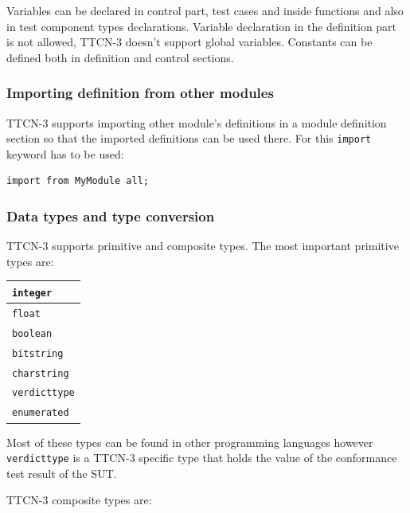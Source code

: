 \documentclass[a4paper]{article}
\begin{document}
Variables can be declared in control part, test cases and inside functions and also in test component types
declarations. Variable declaration in the definition part is not allowed, TTCN-3 doesn't support global variables.
Constants can be defined both in definition and control sections.

\subsubsection{Importing definition from other modules}
TTCN-3 supports importing other module's definitions in a module definition section so that the imported definitions
can be used there. For this \verb.import. keyword has to be used:
{\footnotesize
\begin{lstlisting}
import from MyModule all;
\end{lstlisting}
}

\subsubsection{Data types and type conversion}
TTCN-3 supports primitive and composite types.
The most important primitive types are:
{\footnotesize
\begin{center}
    \begin{tabular}{|l|}
        \hline
        \verb/integer/  \\
        \hline
        \verb/float/  \\
        \hline
        \verb/boolean/  \\
        \hline
        \verb/bitstring/  \\
        \hline
        \verb/charstring/  \\
        \hline
        \verb/verdicttype/  \\
        \hline
        \verb!enumerated!  \\
        \hline
    \end{tabular}
\end{center}
}

Most of these types can be found in other programming languages however \verb!verdicttype! is a TTCN-3
specific type that holds the value of the conformance test result of the SUT.

TTCN-3 composite types are:
\end{document}
